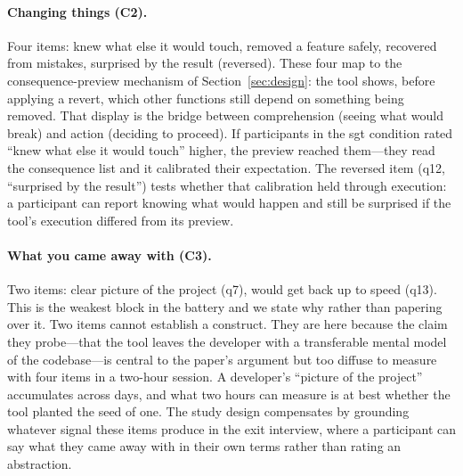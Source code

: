 \paragraph{Changing things (C2).}
Four items: knew what else it would touch, removed a feature safely, recovered
from mistakes, surprised by the result (reversed). These four map to the
consequence-preview mechanism of Section~\ref{sec:design}: the tool shows,
before applying a revert, which other functions still depend on something being
removed. That display is the bridge between comprehension (seeing what would
break) and action (deciding to proceed). If participants in the sgt condition
rated ``knew what else it would touch'' higher, the preview reached them---they
read the consequence list and it calibrated their expectation. The reversed
item (q12, ``surprised by the result'') tests whether that calibration held
through execution: a participant can report knowing what would happen and still
be surprised if the tool's execution differed from its preview.

\paragraph{What you came away with (C3).}
Two items: clear picture of the project (q7), would get back up to speed (q13).
This is the weakest block in the battery and we state why rather than papering
over it. Two items cannot establish a construct. They are here because the claim
they probe---that the tool leaves the developer with a transferable mental model
of the codebase---is central to the paper's argument but too diffuse to measure
with four items in a two-hour session. A developer's ``picture of the project''
accumulates across days, and what two hours can measure is at best whether the
tool planted the seed of one. The study design compensates by grounding whatever
signal these items produce in the exit interview, where a participant can say what
they came away with in their own terms rather than rating an abstraction.

